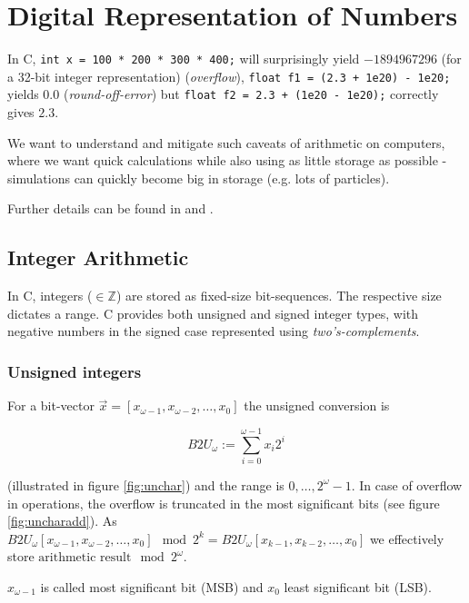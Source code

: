 \section{Digital Representation of Numbers}
\thispagestyle{plain}

In C, \texttt{int x = 100 * 200 * 300 * 400;} will surprisingly yield $-1894967296$ (for a 32-bit integer
representation) (\textit{overflow}), \texttt{float f1 = (2.3 + 1e20) - 1e20;} yields $0.0$ (\textit{round-off-error}) but
\texttt{float f2 = 2.3 + (1e20 - 1e20);} correctly gives $2.3$.

We want to understand and mitigate such caveats of arithmetic on computers, where we want quick calculations while also
using as little storage as possible - simulations can quickly become big in storage (e.g. lots of particles).

Further details can be found in \cite{higham02} and \cite{bryant2011computer}.

\subsection{Integer Arithmetic}

In C, integers ($\in \mathbb{Z}$) are stored as fixed-size bit-sequences. The respective size
dictates a range. C provides both unsigned and signed integer types, with negative numbers
in the signed case represented using \textit{two's-complements}.

\subsubsection{Unsigned integers}
For a bit-vector $\vec{x} = [x_{\omega-1},x_{\omega-2},\dots,x_0]$ the unsigned conversion is

\begin{equation}
    B2U_{\omega} := \sum_{i=0}^{\omega-1} x_i 2^i
\end{equation}

(illustrated in figure \ref{fig:unchar}) and the range is $0,\dots,2^\omega - 1$. In case of overflow in operations, the overflow is truncated
in the most significant bits (see figure \ref{fig:uncharadd}). As $B2U_{\omega}[x_{\omega-1},x_{\omega-2},\dots,x_0] \mod 2^k = 
B2U_{\omega}[x_{k-1},x_{k-2},\dots,x_0]$ we effectively store $\text{arithmetic result}\mod 2^\omega$.

$x_{\omega-1}$ is called most significant bit (MSB) and $x_0$ least significant bit (LSB).

